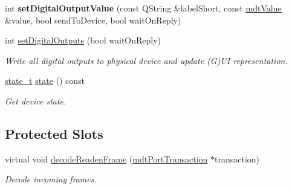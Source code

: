 \begin{DoxyCompactItemize}
\item 
\hypertarget{classmdt_device_a2377d24cc1e767a24dfc5e34454a8737}{
int {\bfseries setDigitalOutputValue} (const QString \&labelShort, const \hyperlink{classmdt_value}{mdtValue} \&value, bool sendToDevice, bool waitOnReply)}
\label{classmdt_device_a2377d24cc1e767a24dfc5e34454a8737}

\item 
int \hyperlink{classmdt_device_a7b86a816e55a91f0d62426e1741437c6}{setDigitalOutputs} (bool waitOnReply)
\begin{DoxyCompactList}\small\item\em Write all digital outputs to physical device and update (G)UI representation. \end{DoxyCompactList}\item 
\hypertarget{classmdt_device_afde11f7cb1d6a932db3824011f7ccccc}{
\hyperlink{classmdt_device_a39c301b1fda803dba0c9ab98164a9d1e}{state\_\-t} \hyperlink{classmdt_device_afde11f7cb1d6a932db3824011f7ccccc}{state} () const }
\label{classmdt_device_afde11f7cb1d6a932db3824011f7ccccc}

\begin{DoxyCompactList}\small\item\em Get device state. \end{DoxyCompactList}\end{DoxyCompactItemize}
\subsection*{Protected Slots}
\begin{DoxyCompactItemize}
\item 
virtual void \hyperlink{classmdt_device_ad211ba3be781c3db0397d5bf91f796d1}{decodeReadenFrame} (\hyperlink{classmdt_port_transaction}{mdtPortTransaction} $\ast$transaction)
\begin{DoxyCompactList}\small\item\em Decode incoming frames. \end{DoxyCompactList}\end{DoxyCompactItemize}
